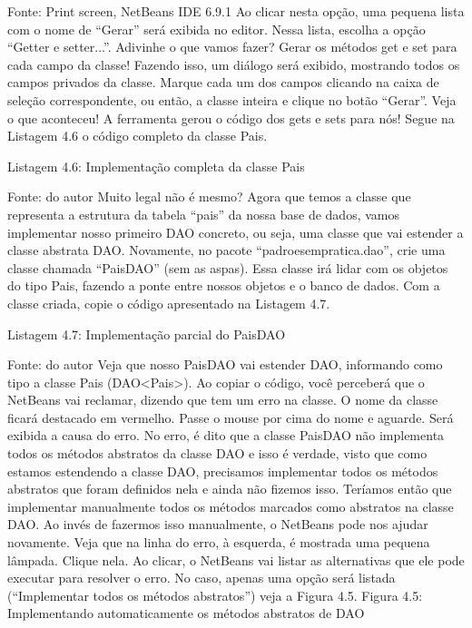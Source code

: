 Fonte: Print screen, NetBeans IDE 6.9.1
Ao clicar nesta opção, uma pequena lista com o nome de “Gerar” será exibida no editor. Nessa lista, escolha a opção “Getter e setter...”. Adivinhe o que vamos fazer? Gerar os métodos get e set para cada campo da classe! Fazendo isso, um diálogo será exibido, mostrando todos os campos privados da classe. Marque cada um dos campos clicando na caixa de seleção correspondente, ou então, a classe inteira e clique no botão “Gerar”. Veja o que aconteceu! A ferramenta gerou o código dos gets e sets para nós! Segue na Listagem 4.6 o código completo da classe Pais.







Listagem 4.6: Implementação completa da classe Pais
 
Fonte: do autor
Muito legal não é mesmo? Agora que temos a classe que representa a estrutura da tabela “pais” da nossa base de dados, vamos implementar nosso primeiro DAO concreto, ou seja, uma classe que vai estender a classe abstrata DAO. Novamente, no pacote “padroesempratica.dao”, crie uma classe chamada “PaisDAO” (sem as aspas). Essa classe irá lidar com os objetos do tipo Pais, fazendo a ponte entre nossos objetos e o banco de dados. Com a classe criada, copie o código apresentado na Listagem 4.7.




Listagem 4.7: Implementação parcial do PaisDAO
 
Fonte: do autor
Veja que nosso PaisDAO vai estender DAO, informando como tipo a classe Pais (DAO<Pais>). Ao copiar o código, você perceberá que o NetBeans vai reclamar, dizendo que tem um erro na classe. O nome da classe ficará destacado em vermelho. Passe o mouse por cima do nome e aguarde. Será exibida a causa do erro. No erro, é dito que a classe PaisDAO não implementa todos os métodos abstratos da classe DAO e isso é verdade, visto que como estamos estendendo a classe DAO, precisamos implementar todos os métodos abstratos que foram definidos nela e ainda não fizemos isso. Teríamos então que implementar manualmente todos os métodos marcados como abstratos na classe DAO. Ao invés de fazermos isso manualmente, o NetBeans pode nos ajudar novamente. Veja que na linha do erro, à esquerda, é mostrada uma pequena lâmpada. Clique nela. Ao clicar, o NetBeans vai listar as alternativas que ele pode executar para resolver o erro. No caso, apenas uma opção será listada (“Implementar todos os métodos abstratos”) veja a Figura 4.5.
Figura 4.5: Implementando automaticamente os métodos abstratos de DAO
 
